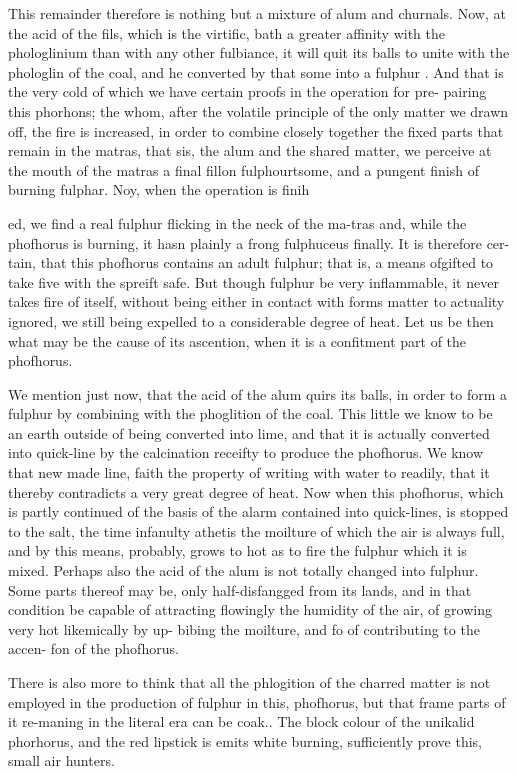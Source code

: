 \documentclass{article}
\begin{document}
This remainder therefore is nothing but a mixture of alum and churnals. Now, at the acid of the fils, which is the virtific, bath a greater affinity with the phologlinium than with any other fulbiance, it will quit its balls to unite with the phologlin of the coal, and he converted by that some into a fulphur . And that is the very cold of which we have certain proofs in the operation for pre- pairing this phorhons; the whom, after the volatile principle of the only matter we drawn off, the fire is increased, in order to combine closely together the fixed parts that remain in the matras, that sis, the alum and the shared matter, we perceive at the mouth of the matras a final fillon fulphourtsome, and a pungent finish of burning fulphar. Noy, when the operation is finih

ed, we find a real fulphur flicking in the neck of the ma-tras and, while the phofhorus is burning, it hasn plainly a frong fulphuceus finally. It is therefore cer-tain, that this phofhorus contains an adult fulphur; that is, a means ofgifted to take five with the spreift safe. But though fulphur be very inflammable, it never takes fire of itself, without being either in contact with forms matter to actuality ignored, we still being expelled to a considerable degree of heat. Let us be then what may be the cause of its ascention, when it is a confitment part of the phofhorus.

We mention just now, that the acid of the alum quirs its balls, in order to form a fulphur by combining with the phoglition of the coal. This little we know to be an earth outside of being converted into lime, and that it is actually converted into quick-line by the calcination receifty to produce the phofhorus. We know that new made line, faith the property of writing with water to readily, that it thereby contradicts a very great degree of heat. Now when this phofhorus, which is partly continued of the basis of the alarm contained into quick-lines, is stopped to the salt, the time infanulty athetis the moilture of which the air is always full, and by this means, probably, grows to hot as to fire the fulphur which it is mixed. Perhaps also the acid of the alum is not totally changed into fulphur. Some parts thereof may be, only half-disfangged from its lands, and in that condition be capable of attracting flowingly the humidity of the air, of growing very hot likemically by up- bibing the moilture, and fo of contributing to the accen- fon of the phofhorus.

There is also more to think that all the phlogition of the charred matter is not employed in the production of fulphur in this, phofhorus, but that frame parts of it re-maning in the literal era can be coak.. The block colour of the unikalid phorhorus, and the red lipstick is emits white burning, sufficiently prove this, small air hunters.
\end{document}
